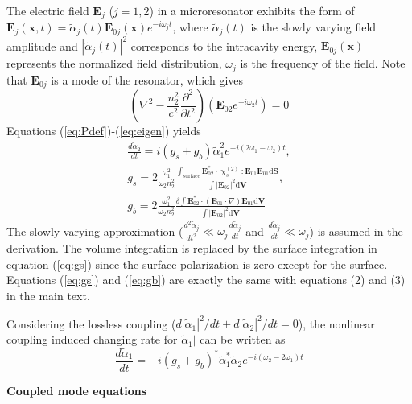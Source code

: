 \documentclass[a4paper,8pt,hyperref, aps, prl]{article}
\begin{document}
The electric field $\mathbf{E}_j$ ($j = 1,2$) in a microresonator exhibits the form of $\mathbf{E}_j (\mathbf{x}, t) = \tilde{\alpha}_j (t) \mathbf{E}_{0j} (\mathbf{x}) e^{-i\omega_j t}$, where $\tilde{\alpha}_j (t)$ is the slowly varying field amplitude and $|\tilde{\alpha}_j (t)|^2$ corresponds to the intracavity energy, $\mathbf{E}_{0j} (\mathbf{x})$ represents the normalized field distribution, $\omega_j$ is the frequency of the field. 
Note that $\mathbf{E}_{0j}$ is a mode of the resonator, which gives
\begin{equation}
(\nabla^2 -\frac{n_2^2}{c^2}\frac{\partial^2}{\partial t^2})(\mathbf{E}_{02}e^{-i\omega_2 t}) = 0
\label{eq:eigen}
\end{equation}
Equations (\ref{eq:Pdef})-(\ref{eq:eigen}) yields
\begin{gather}
\frac{d \tilde{\alpha}_2}{dt} =  i(g_{s}+g_{b})\tilde{\alpha}_1^2e^{-i(2\omega_1-\omega_2)t}, \\
g_{s}  = 2\frac{\omega_1^2}{\omega_2n_2^2}\frac{\int_{\mathrm{surface} } \mathbf{E}_{02}^* \cdot \upchi^{(2)}_{s}:\mathbf{E}_{01}\mathbf{E}_{01} \mathrm{d}	\mathbf{S}}{\int |\mathbf{E}_{02}|^2 \mathrm{d}	\mathbf{V}}, \label{eq:gs} \\
g_b =  2\frac{\omega_1^2}{\omega_2n_2^2}\frac{\delta \int \mathbf{E}_{02}^* \cdot (\mathbf{E}_{01}\cdot\nabla)\mathbf{E}_{01} \mathrm{d}	\mathbf{V}}{\int |\mathbf{E}_{02}|^2 \mathrm{d} \mathbf{V}}
\label{eq:gb}
\end{gather}
The slowly varying approximation ($\frac{d^2\tilde{\alpha}_j}{dt^2} \ll \omega_j\frac{d\tilde{\alpha}_j}{dt}$ and $\frac{d\tilde{\alpha}_j}{dt} \ll \omega_j$) is assumed in the derivation. The volume integration is replaced by the surface integration in equation (\ref{eq:gs}) since the surface polarization is zero except for the surface. Equations (\ref{eq:gs}) and (\ref{eq:gb}) are exactly the same with equations (2) and (3) in the main text.

Considering the lossless coupling ($d|\tilde{\alpha}_1|^2/dt+d|\tilde{\alpha}_2|^2/dt=0$), the nonlinear coupling induced changing rate for $\tilde{\alpha}_1|$ can be written as 
\begin{equation}
\frac{d \tilde{\alpha}_1}{dt} =  -i(g_{s}+g_{b})^*\tilde{\alpha}_1^*\tilde{\alpha}_2e^{-i(\omega_2-2\omega_1)t}
\end{equation}

\textbf{Coupled mode equations}
\end{document}
